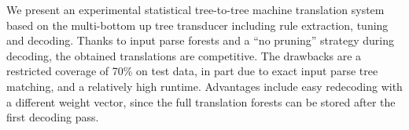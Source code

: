 We present an experimental statistical tree-to-tree machine translation system based on the multi-bottom up tree transducer including rule extraction, tuning and decoding.  Thanks to input parse forests and a ``no pruning'' strategy during decoding, the obtained translations are competitive.  The drawbacks are a restricted coverage of 70\% on test data, in part due to exact input parse tree matching, and a relatively high runtime.  Advantages include easy redecoding with a different weight vector, since the full translation forests can be stored after the first decoding pass.
